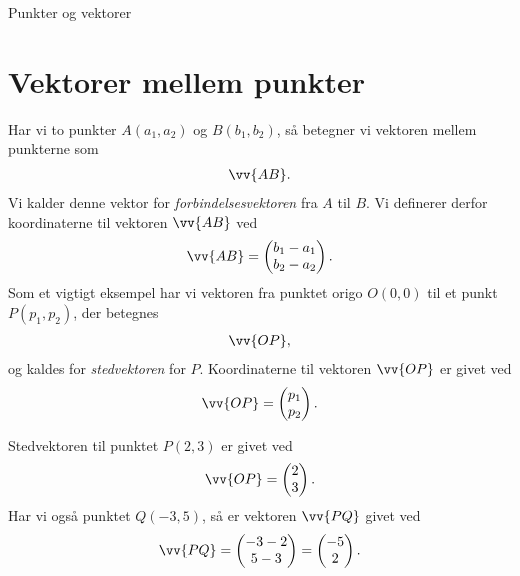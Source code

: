 \begin{center}
\Huge
Punkter og vektorer
\end{center}

\section*{Vektorer mellem punkter}
Har vi to punkter $A(a_1,a_2)$ og $B(b_1,b_2)$, så betegner vi vektoren mellem punkterne som
\begin{align*}
\vv{AB}.
\end{align*}
Vi kalder denne vektor for \textit{forbindelsesvektoren} fra $A$ til $B$.
Vi definerer derfor koordinaterne til vektoren $\vv{AB}$ ved 
\begin{align*}
	\vv{AB} = 
	\begin{pmatrix}
		b_1 - a_1\\b_2-a_2
	\end{pmatrix}.
\end{align*}
Som et vigtigt eksempel har vi vektoren fra punktet origo $O(0,0)$ til et punkt $P(p_1,p_2)$, der betegnes 
\begin{align*}
\vv{OP},
\end{align*}
og kaldes for \textit{stedvektoren} for $P$. 
Koordinaterne til vektoren $\vv{OP}$ er givet ved 
\begin{align*}
	\vv{OP} = 
	\begin{pmatrix}
		p_1\\p_2
	\end{pmatrix}.
\end{align*}
\begin{exa}
Stedvektoren til punktet $P(2,3)$ er givet ved 
\begin{align*}
	\vv{OP} = 
	\begin{pmatrix}
		2\\3
	\end{pmatrix}.
\end{align*}
Har vi også punktet $Q(-3,5)$, så er vektoren $\vv{PQ}$ givet ved
\begin{align*}
	\vv{PQ} =
	\begin{pmatrix}
		-3-2\\
		5-3
	\end{pmatrix} =
	\begin{pmatrix}
		-5\\2
	\end{pmatrix}.
\end{align*}
\end{exa}

